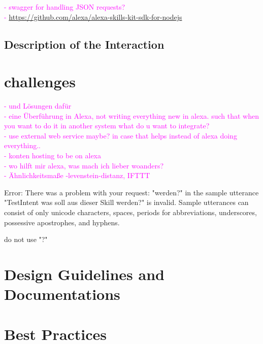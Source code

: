 \textcolor{magenta}{
- swagger for handling JSON requests?\\
- \url{https://github.com/alexa/alexa-skills-kit-sdk-for-nodejs}
}


\subsection*{Description of the Interaction}


\section{challenges}

\textcolor{magenta}{
- und L\"osungen daf\"ur\\
- eine \"Uberf\"uhrung in Alexa, not writing everything new in alexa. such that when you want to do it in another system what do u want to integrate?\\
- use external web service maybe? in case that helps instead of alexa doing everything..\\
- konten hosting to be on alexa\\
- wo hilft mir alexa, was mach ich lieber woanders?\\
- \"Ahnlichkeitsma{\ss}e -levenstein-distanz, IFTTT
}


Error: There was a problem with your request: "werden?" in the sample utterance "TestIntent was soll aus dieser Skill werden?" is invalid. Sample utterances can consist of only unicode characters, spaces, periods for abbreviations, underscores, possessive apostrophes, and hyphens.

do not use "?"



\section{Design Guidelines and Documentations}
\label{designGuide}





\section{Best Practices}



